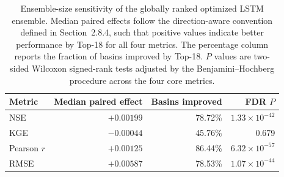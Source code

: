 \begin{table}[htbp]
\centering
\caption{Ensemble-size sensitivity of the globally ranked optimized LSTM ensemble. Median paired effects follow the direction-aware convention defined in Section~2.8.4, such that positive values indicate better performance by Top-18 for all four metrics. The percentage column reports the fraction of basins improved by Top-18. $P$ values are two-sided Wilcoxon signed-rank tests adjusted by the Benjamini--Hochberg procedure across the four core metrics.}
\label{tab:top18_size_control}
\small
\renewcommand{\arraystretch}{1.12}
\begin{tabular}{lrrr}
\toprule
Metric & Median paired effect & Basins improved & FDR $P$ \\
\midrule
NSE & $+0.00199$ & 78.72\% & $1.33\times10^{-42}$ \\
KGE & $-0.00044$ & 45.76\% & 0.679 \\
Pearson $r$ & $+0.00125$ & 86.44\% & $6.32\times10^{-57}$ \\
RMSE & $+0.00587$ & 78.53\% & $1.07\times10^{-44}$ \\
\bottomrule
\end{tabular}
\end{table}
